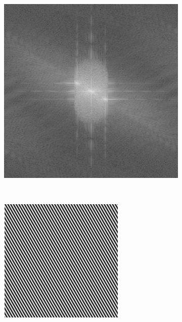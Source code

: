 \begin{figure}[h]
\begin{subfigure}[t]{0.23\textwidth}
        \caption{}
    \end{subfigure}\hfill
    \begin{subfigure}[t]{0.23\textwidth}
        \centering
        \includegraphics[width=\textwidth]{sim_slit/2/fft}
        \caption{}
    \end{subfigure}\\
    \begin{subfigure}[t]{0.23\textwidth}
        \centering
        \includegraphics[width=\textwidth]{sim_slit/3/vert_pattern}

\end{subfigure}
\end{figure}
